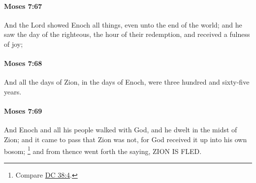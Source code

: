 		\paragraph{Moses 7:67} %
			\label{MOSES-7-67}

			And the Lord showed Enoch all things, even unto the end of the world; and he saw the day of the righteous, the hour of their redemption, and received a fulness of joy;


		\paragraph{Moses 7:68} %
			\label{MOSES-7-68}

			And all the days of Zion, in the days of Enoch, were three hundred and sixty-five years.


		\paragraph{Moses 7:69} %
			\label{MOSES-7-69}

			And Enoch and all his people walked with God, and he dwelt in the midst of Zion; and it came to pass that Zion was not, for God received it up into his own bosom;%
			\footnote{%
				Compare \hyperref[DC38-4]{DC 38:4}.
				} 
			and from thence went forth the saying, ZION IS FLED.

		
